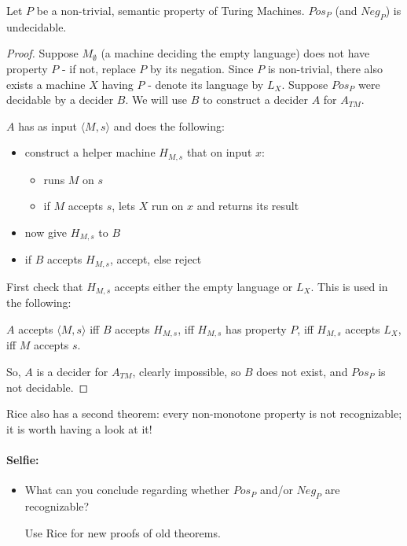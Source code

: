 
\begin{theorem}
Let $P$ be a non-trivial, semantic property of Turing
Machines. $Pos_P$ (and $Neg_P$) is undecidable.
\end{theorem}
\begin{proof}
Suppose $M_\emptyset$ (a machine deciding the empty language) does not
have property $P$ - if not, replace $P$ by its negation. Since $P$ is
non-trivial, there also exists a machine $X$ having $P$ - denote
its language by $L_X$. Suppose $Pos_P$ were decidable by a decider
$B$. We will use $B$ to construct a decider $A$ for $A_{TM}$.

$A$ has as input $\langle M,s \rangle$ and does the following:
\begin{itemize}
\item construct a helper machine $H_{M,s}$ that on input $x$:

\begin{itemize}
\item runs $M$ on $s$
\item if $M$ accepts $s$, lets $X$ run on $x$ and returns its result
\end{itemize}

\item now give $H_{M,s}$ to $B$
\item if $B$ accepts $H_{M,s}$, accept, else reject
\end{itemize}
First check that $H_{M,s}$ accepts either the empty language or
$L_X$. This is used in the following:


$A$ accepts $\langle M,s \rangle$ iff $B$ accepts $H_{M,s}$, iff
%
$H_{M,s}$ has property $P$, iff
%
$H_{M,s}$ accepts $L_X$, iff
%
$M$ accepts $s$.

So, $A$ is a decider for $A_{TM}$, clearly impossible, so $B$ does not
exist, and $Pos_P$ is not decidable.
\end{proof}

Rice also has a second theorem: every non-monotone property is not
recognizable; it is worth having a look at it!

\paragraph{Selfie:}
\begin{itemize}
\item[]
What can you conclude regarding whether $Pos_P$ and/or $Neg_P$ are
recognizable?

Use Rice for new proofs of old theorems.
\end{itemize}


